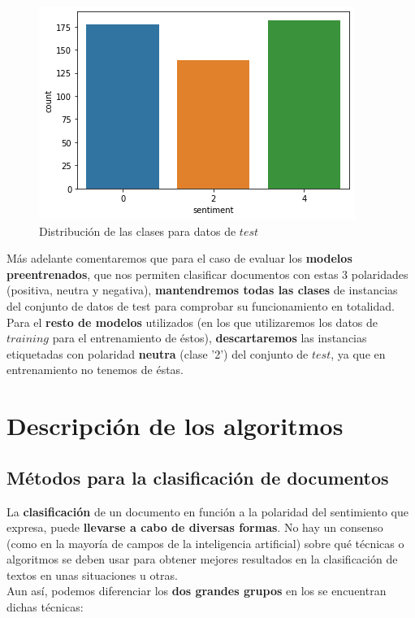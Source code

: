 \documentclass[a4paper,12pt]{report}
\begin{document}
\begin{figure}[htbp!]
\begin{center}
\includegraphics[scale=0.6]{images/test.png}
\end{center}
\caption{Distribución de las clases para datos de $test$}
\end{figure}

{\setlength{\parindent}{0cm}
Más adelante comentaremos que para el caso de evaluar los \textbf{modelos preentrenados}, que nos permiten clasificar documentos con estas 3 polaridades (positiva, neutra y negativa), \textbf{mantendremos todas las clases} de instancias del conjunto de datos de test para comprobar su funcionamiento en totalidad.}
\vspace{2mm}\\
Para el \textbf{resto de modelos} utilizados (en los que utilizaremos los datos de $training$ para el entrenamiento de éstos), \textbf{descartaremos} las instancias etiquetadas con polaridad \textbf{neutra} (clase '2') del conjunto de $test$, ya que en entrenamiento no tenemos de éstas.


\chapter{Descripción de los algoritmos}

\section{Métodos para la clasificación de documentos}

{\setlength{\parindent}{0cm}
La \textbf{clasificación} de un documento en función a la polaridad del sentimiento que expresa, puede \textbf{llevarse a cabo de diversas formas}. No hay un consenso (como en la mayoría de campos de la inteligencia artificial) sobre qué técnicas o algoritmos se deben usar para obtener mejores resultados en la clasificación de textos en unas situaciones u otras. }
\vspace{2mm}\\
Aun así, podemos diferenciar los \textbf{dos grandes grupos} en los se encuentran dichas técnicas:
\end{document}
